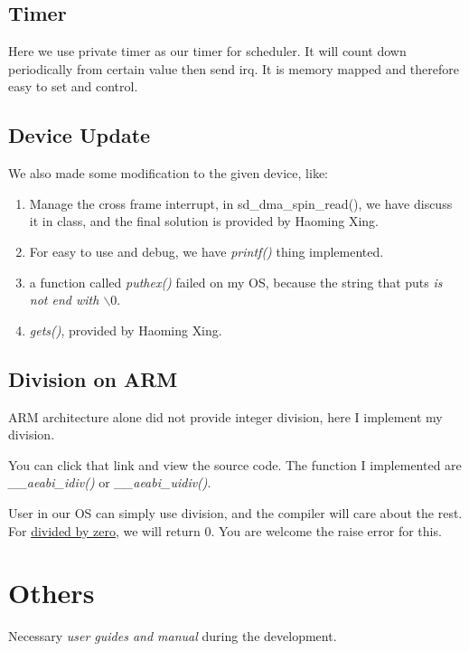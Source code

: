 \documentclass[12pt]{article}
\begin{document}
\subsection{Timer}

Here we use private timer as our timer for scheduler. It will count down periodically from certain value then send irq. It is memory mapped and therefore easy to set and control.

\subsection{Device Update}

We also made some modification to the given device, like:

\begin{enumerate}
	\item	Manage the cross frame interrupt, in sd\_dma\_spin\_read(), we have discuss it in class, and the final solution is provided by Haoming Xing.
	\item	For easy to use and debug, we have \emph{printf()} thing implemented.
	\item a function called \emph{puthex()} failed on my OS, because the string that puts \emph{is not end with $\backslash 0$}.
	\item \emph{gets()}, provided by Haoming Xing.
\end{enumerate}

\subsection{Division on ARM}

ARM architecture alone did not provide integer division, here I implement my division.\cite{---todo---}

You can click that link and view the source code. The function I implemented are \emph{\_\_aeabi\_idiv()} or \emph{\_\_aeabi\_uidiv()}.

User in our OS can simply use division, and the compiler will care about the rest. For \underline{divided by zero}, we will return 0. You are welcome the raise error for this.

\section{Others}

Necessary \emph{user guides and manual} during the development.
\end{document}
